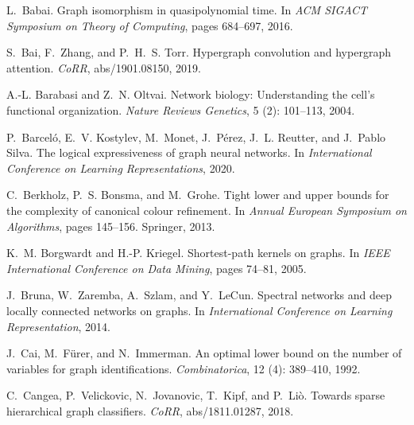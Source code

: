 \documentclass{article}
\theoremstyle{definition}
\begin{document}
\begin{thebibliography}{125}
	L.~Babai.
	\newblock Graph isomorphism in quasipolynomial time.
	\newblock In \emph{{ACM} {SIGACT} Symposium on Theory of Computing}, pages
	684--697, 2016.
	
	S.~Bai, F.~Zhang, and P.~H.~S. Torr.
	\newblock Hypergraph convolution and hypergraph attention.
	\newblock \emph{CoRR}, abs/1901.08150, 2019.
	
	A.-L. Barabasi and Z.~N. Oltvai.
	\newblock Network biology: Understanding the cell’s functional organization.
	\newblock \emph{Nature Reviews Genetics}, 5 (2): 101--113,
	2004.
	
	P.~Barcel{\'{o}}, E.~V. Kostylev, M.~Monet, J.~P{\'{e}}rez, J.~L. Reutter, and
	J.~Pablo Silva.
	\newblock The logical expressiveness of graph neural networks.
	\newblock In \emph{International Conference on Learning Representations}, 2020.
	
	C.~Berkholz, P.~S. Bonsma, and M.~Grohe.
	\newblock Tight lower and upper bounds for the complexity of canonical colour
	refinement.
	\newblock In \emph{Annual European Symposium on Algorithms}, pages 145--156.
	Springer, 2013.
	
	K.~M. Borgwardt and H.-P. Kriegel.
	\newblock Shortest-path kernels on graphs.
	\newblock In \emph{IEEE International Conference on Data Mining}, pages 74--81,
	2005.
	
	J.~Bruna, W.~Zaremba, A.~Szlam, and Y.~LeCun.
	\newblock Spectral networks and deep locally connected networks on graphs.
	\newblock In \emph{International Conference on Learning Representation}, 2014.
	
	J.~Cai, M.~F{\"{u}}rer, and N.~Immerman.
	\newblock An optimal lower bound on the number of variables for graph
	identifications.
	\newblock \emph{Combinatorica}, 12 (4): 389--410, 1992.
	
	C.~Cangea, P.~Velickovic, N.~Jovanovic, T.~Kipf, and P.~Li{\`{o}}.
	\newblock Towards sparse hierarchical graph classifiers.
	\newblock \emph{CoRR}, abs/1811.01287, 2018.
	

\end{thebibliography}
\end{document}
